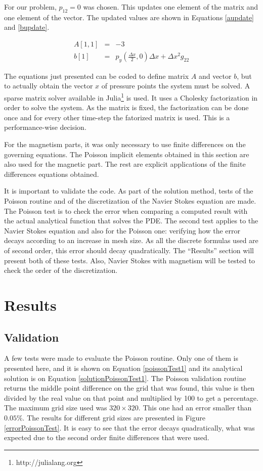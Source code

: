 \documentclass[journal]{IEEEtran}
\begin{document}
For our problem, $p_{12} = 0$ was chosen. This updates one element of the matrix and one element of the vector. The updated values are shown in Equations \ref{aupdate} and \ref{bupdate}.

\begin{eqnarray}
A[1,1] &=& -3 \label{aupdate} \\
b[1] & = & p_y\left(\frac{\Delta x}{2},0\right)\Delta x + \Delta x^2 g_{22} \label{bupdate}
\end{eqnarray}

The equations just presented can be coded to define matrix $A$ and vector $b$, but to actually obtain the vector $x$ of pressure points the system must be solved. A sparse matrix solver available in Julia\footnote{http://julialang.org} is used. It uses a Cholesky factorization in order to solve the system. As the matrix is fixed, the factorization can be done once and for every other time-step the fatorized matrix is used. This is a performance-wise decision.

For the magnetism parts, it was only necessary to use finite differences on the governing equations. The Poisson implicit elements obtained in this section are also used for the magnetic part. The rest are explicit applications of the finite differences equations obtained.

It is important to validate the code. As part of the solution method, tests of the Poisson routine and of the discretization of the Navier Stokes equation are made. The Poisson test is to check the error when comparing a computed result with the actual analytical function that solves the PDE. The second test applies to the Navier Stokes equation and also for the Poisson one: verifying how the error decays according to an increase in mesh size. As all the discrete formulas used are of second order, this error should decay quadratically. The ``Results'' section will present both of these tests. Also, Navier Stokes with magnetism will be tested to check the order of the discretization.

\section{Results}
\subsection{Validation}

A few tests were made to evaluate the Poisson routine. Only one of them is presented here, and it is shown on Equation \ref{poissonTest1} and its analytical solution is on Equation \ref{solutionPoissonTest1}. The Poisson validation routine returns the middle point difference on the grid that was found, this value is then divided by the real value on that point and multiplied by 100 to get a percentage. The maximum grid size used was $320\times 320$. This one had an error smaller than $0.05\%$. The results for different grid sizes are presented in Figure \ref{errorPoissonTest}. It is easy to see that the error decays quadratically, what was expected due to the second order finite differences that were used.
\end{document}
